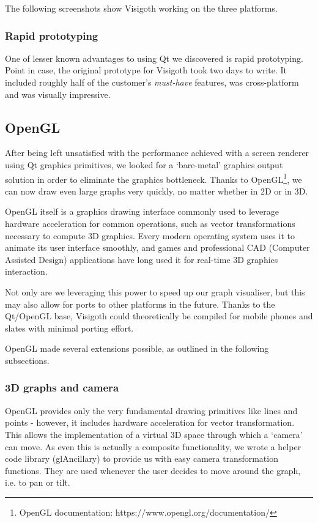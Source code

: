 \documentclass[a4paper,11pt,titlepage]{article}
\begin{document}
The following screenshots show Visigoth working on the three
platforms.

\subsubsection{Rapid prototyping}

One of lesser known advantages to using Qt we discovered is rapid
prototyping. Point in case, the original prototype for Visigoth took
two days to write. It included roughly half of the customer's
\emph{must-have} features, was cross-platform and was visually
impressive.

\subsection{OpenGL}

After being left unsatisfied with the performance achieved with a
screen renderer using Qt graphics primitives, we looked for a `bare-metal'
graphics output solution in order to eliminate the graphics bottleneck.
Thanks to OpenGL\footnote{OpenGL documentation:
https://www.opengl.org/documentation/},
we can now draw even large graphs very quickly,
no matter whether in 2D or in 3D.

OpenGL itself is a graphics drawing interface commonly used to
leverage hardware acceleration for common operations, such as vector
transformations necessary to compute 3D graphics. Every modern
operating system uses it to animate its user interface smoothly,
and games and professional CAD (Computer Assisted Design) applications
have long used it for real-time 3D graphics interaction.

Not only are we leveraging this power to speed up our graph
visualiser, but this may also allow for ports to other
platforms in the future. Thanks to the Qt/OpenGL base, Visigoth
could theoretically be compiled for mobile phones and slates
with minimal porting effort.

OpenGL made several extensions possible, as outlined in the following
subsections.

\subsubsection{3D graphs and camera}
OpenGL provides only the very fundamental drawing primitives like
lines and points - however, it includes hardware acceleration for
vector transformation. This allows the implementation of a virtual
3D space through which a `camera' can move. As even this is actually
a composite functionality, we wrote a helper code library (glAncillary)
to provide us with easy camera transformation functions. They are
used whenever the user decides to move around the graph, i.e. to
pan or tilt.
\end{document}
